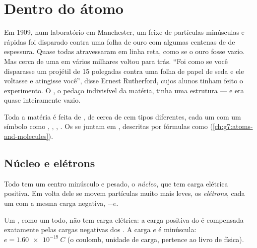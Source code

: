 \chapter{Dentro do átomo}\label{ch:g9:inside-the-atom}

Em 1909, num laboratório em Manchester, um feixe de partículas minúsculas
e rápidas foi disparado contra uma folha de ouro com algumas centenas de
 de espessura. Quase todas atravessaram em linha reta, como se o
ouro fosse vazio. Mas cerca de uma em vários milhares voltou para trás.
``Foi como se você disparasse um projétil de 15 polegadas contra uma
folha de papel de seda e ele voltasse e atingisse você'', disse Ernest
Rutherford, cujos alunos tinham feito o experimento. O , o pedaço
indivisível da matéria, tinha uma estrutura --- e era quase
inteiramente vazio.

\begin{recall}
Toda a matéria é feita de , de cerca de cem tipos diferentes, cada
um com um símbolo como , , , . Os  se
juntam em , descritas por fórmulas como 
(\cref{ch:g7:atoms-and-molecules}).
\end{recall}

\section{Núcleo e elétrons}

\begin{definition}\label{def:g9:inside-the-atom:nucleus}
Todo  tem um centro minúsculo e pesado, o
\emph{núcleo}, que tem carga elétrica positiva. Em volta
dele se movem partículas muito mais leves, os
\emph{elétrons}, cada um com a mesma carga negativa,
$-e$.
\end{definition}

\begin{proposition}\label{prop:g9:inside-the-atom:neutral}
Um , como um todo, não tem carga elétrica: a carga positiva do
 é compensada exatamente pelas cargas negativas dos . A
carga $e$ é minúscula: $e = \qty{1.60e-19}{C}$ (o coulomb, unidade de
carga, pertence ao livro de física).
\end{proposition}

